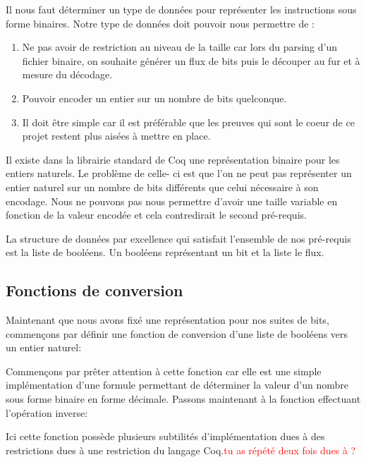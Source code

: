 \documentclass {article}
\newcommand{\codefrom}[3]
           {}
\theoremstyle{definition}
\theoremstyle{remark}
\newcommand{\todo}[1]{\textcolor{red}{#1}}
\begin{document}
Il nous faut déterminer un type de données pour représenter
les instructions sous forme binaires.
Notre type de données doit pouvoir nous permettre de :
\begin{enumerate}
\item Ne pas avoir de restriction au niveau de la taille car lors du parsing d'un fichier binaire,
  on souhaite générer un flux de bits puis le découper au fur et à mesure du décodage.
\item Pouvoir encoder un entier sur un nombre de bits quelconque.
\item Il doit être simple car il est préférable que les preuves qui sont le coeur de ce projet restent
  plus aisées à mettre en place.
\end{enumerate}

Il existe dans la librairie standard de Coq une représentation binaire pour les entiers naturels.
Le problème de celle- ci est que l'on ne peut pas représenter un entier naturel sur un nombre de bits différents
que celui nécessaire à son encodage. Nous ne pouvons pas nous permettre d'avoir une taille variable en
fonction de la valeur encodée et cela contredirait le second pré-requis.

La structure de données par excellence qui satisfait l'ensemble de nos pré-requis est la liste de booléens.
Un booléens représentant un bit et la liste le flux.

\codefrom{src}{ast_instructions}{binary_instruction}




\subsection{Fonctions de conversion}
\label{Fonctions de conversion}
Maintenant que nous avons fixé une représentation pour nos suites de bits, commençons par définir
une fonction de conversion d'une liste de booléens vers un entier naturel:

\codefrom{src}{binary}{bitn}

Commençons par prêter attention à cette fonction car elle est une simple implémentation
d'une formule permettant de déterminer la valeur d'un nombre sous forme binaire
en forme décimale. Passons maintenant à la fonction effectuant l'opération inverse:

\codefrom{src}{binary}{nbit}


Ici cette fonction possède plusieurs subtilités d'implémentation dues à des restrictions dues
à une restriction du langage Coq.\todo{tu as répété deux fois dues à ?}
\end{document}
